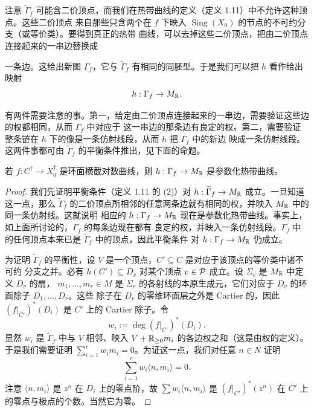 注意 $\widetilde{\Gamma}_f$ 可能含二价顶点，而我们在热带曲线的定义（定义 1.11）中不允许这种顶点。这些二价顶点
来自那些只含两个在 $f$ 下映入 $\operatorname{Sing}(X_0)$ 的节点的不可约分支（或等价类）。要得到真正的热带
曲线，可以去掉这些二价顶点，把由二价顶点连接起来的一串边替换成


一条边。这给出新图 $\Gamma_f$，它与 $\widetilde{\Gamma}_f$ 有相同的同胚型。于是我们可以把 $h$ 看作给出映射
\[
h : \Gamma_f \to M_{\mathbb{R}}.
\]

有两件需要注意的事。第一，给定由二价顶点连接起来的一串边，需要验证这些边的权都相同，从而 $\Gamma_f$ 中对应于
这一串边的那条边有良定的权。第二，需要验证整条链在 $h$ 下的像是一条仿射线段，从而 $h$ 把 $\Gamma_f$ 中的新边
映成一条仿射线段。这两件事都可由 $\widetilde{\Gamma}_f$ 的平衡条件推出，见下面的命题。

\begin{proposition}
若 $f : C^{\dagger} \to X_0^{\dagger}$ 是环面横截对数曲线，则 $h : \Gamma_f \to M_{\mathbb{R}}$ 是参数化热带曲线。
\end{proposition}

\begin{proof}
我们先证明平衡条件（定义 1.11 的 (2)）对 $h : \widetilde{\Gamma}_f \to M_{\mathbb{R}}$ 成立。一旦知道这一点，那么
$\widetilde{\Gamma}_f$ 的二价顶点所相邻的任意两条边就有相同的权，并映入 $M_{\mathbb{R}}$ 中的同一条仿射线。这就说明
相应的 $h : \Gamma_f \to M_{\mathbb{R}}$ 现在是参数化热带曲线。事实上，如上面所讨论的，$\Gamma_f$ 的每条边现在都有
良定的权，并映入一条仿射线段。$\Gamma_f$ 中的任何顶点本来已是 $\widetilde{\Gamma}_f$ 中的顶点，因此平衡条件
对 $h : \Gamma_f \to M_{\mathbb{R}}$ 仍成立。

为证明 $\widetilde{\Gamma}_f$ 的平衡性，设 $V$ 是一个顶点，$C'\subseteq C$ 是对应于该顶点的等价类中诸不可约
分支之并。必有 $h(C')\subseteq D_v$ 对某个顶点 $v\in\mathcal{P}$ 成立。设 $\Sigma_v$ 是 $M_{\mathbb{R}}$ 中定义 $D_v$ 的扇，
$m_1,\dots,m_r\in M$ 是 $\Sigma_v$ 的各射线的本原生成元，它们对应于 $D_v$ 的环面除子 $D_1,\dots,D_r$。这些
除子在 $D_v$ 的零维环面层之外是 Cartier 的，因此 $(f|_{C'})^*(D_i)$ 是 $C'$ 上的 Cartier 除子。令
\[
w_i := \deg(f|_{C'})^*(D_i).
\]
显然 $w_i$ 是 $\widetilde{\Gamma}_f$ 中与 $V$ 相邻、映入 $V+\mathbb{R}_{\ge0}m_i$ 的各边权之和（这是由权的定义）。
于是我们需要证明 $\sum_{i=1}^r w_im_i = 0$。为证这一点，我们对任意 $n\in N$ 证明
\[
\sum_{i=1}^r w_i\langle n,m_i\rangle = 0.
\]
注意 $\langle n,m_i\rangle$ 是 $z^n$ 在 $D_i$ 上的零点阶，故 $\sum w_i\langle n,m_i\rangle$ 是
$(f|_{C'})^*(z^n)$ 在 $C'$ 上的零点与极点的个数。当然它为零。
\end{proof}

